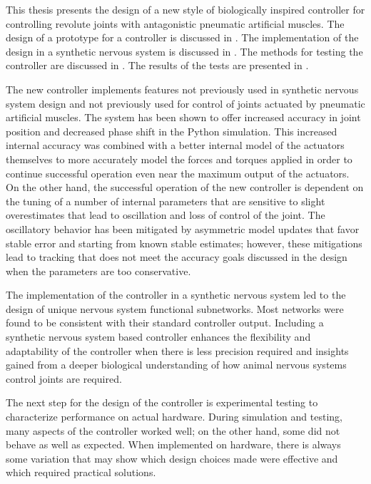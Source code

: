
This thesis presents the design of a new style of biologically inspired
controller for controlling revolute joints with antagonistic pneumatic
artificial muscles. The
design of a prototype for a controller is discussed in
. The implementation of the design in a
synthetic nervous system is discussed in . The methods
for testing the controller are discussed in . The results of
the tests are presented in .

The new controller implements features not previously used in synthetic nervous
system design and not previously used for control of joints actuated by
pneumatic artificial muscles. The system has been shown to offer
increased accuracy in joint position and decreased phase shift in the Python simulation. This increased internal accuracy was
combined with a better internal model of the actuators themselves to more
accurately model the forces and torques applied in order to continue successful
operation even near the maximum output of the actuators. On the other hand, the
successful operation of the new controller is dependent on the tuning of a number of
internal parameters that are sensitive to slight overestimates that lead to
oscillation and loss of control of the joint. The oscillatory behavior has been mitigated by
asymmetric model updates that favor stable error and starting from known stable
estimates; however, these mitigations lead to tracking that does not meet the accuracy goals
discussed in the design when the parameters are too conservative.

The implementation of the controller in a synthetic nervous system led to the
design of unique nervous system functional subnetworks. Most networks
were found to be consistent with their standard controller output.
Including a synthetic nervous system based controller enhances the flexibility and adaptability of the controller when there is less precision required and insights gained from a deeper biological understanding of how animal nervous systems control joints are required.


The next step for the design of the controller is experimental testing to
characterize performance on actual hardware. During simulation and testing,
many aspects of the controller worked well; on the other hand, some did not
behave as well as expected. When implemented on hardware, there is always some variation that may
show which design choices made were effective and which required practical solutions.

